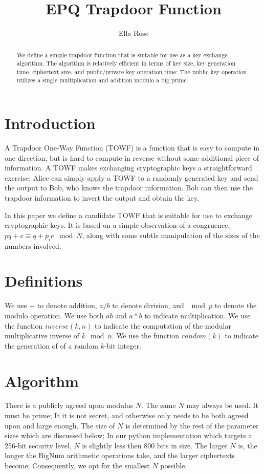 \documentclass[preprint]{iacrtrans}
\author{Ella Rose}
\institute{Paso Robles, CA \email{python_pride@protonmail.com}}
\title[EPQ Trapdoor Function]{EPQ Trapdoor Function}
\begin{document}
\maketitle


\begin{abstract}
 We define a simple trapdoor function that is suitable for use as a key exchange algorithm. The algorithm is relatively efficient in terms of key size, key generation time, ciphertext size, and public/private key operation time: The public key operation utilizes a single multiplication and addition modulo a big prime.
 \end{abstract}

\todototoc
\listoftodos


\section{Introduction}
A Trapdoor One-Way Function (TOWF) is a function that is easy to compute in one direction, but is hard to compute in reverse without some additional piece of information. A TOWF makes exchanging cryptographic keys a straightforward exercise: Alice can simply apply a TOWF to a randomly generated key and send the output to Bob, who knows the trapdoor information. Bob can then use the trapdoor information to invert the output and obtain the key. 

In this paper we define a candidate TOWF that is suitable for use to exchange cryptographic keys. It is based on a simple observation of a congruence, $pq + e \equiv q + p_i e \mod N$, along with some subtle manipulation of the sizes of the numbers involved.

\section{Definitions}
We use $+$ to denote addition, $a / b$ to denote division, and $\mod p$ to denote the modulo operation. We use both $a b$ and $a * b$ to indicate multiplication. We use the function $inverse(k, n)$ to indicate the computation of the modular multiplicative inverse of $k \mod n$. We use the function $random(k)$ to indicate the generation of of a random $k$-bit integer.

\section{Algorithm}
There is a publicly agreed upon modulus $N$. The same $N$ may always be used. It must be prime; It it is not secret, and otherwise only needs to be both agreed upon and large enough. The size of $N$ is determined by the rest of the parameter sizes which are discussed below; In our python implementation which targets a 256-bit security level, $N$ is slightly less then 800 bits in size. The larger $N$ is, the longer the BigNum arithmetic operations take, and the larger ciphertexts become; Consequently, we opt for the smallest $N$ possible.
\end{document}
